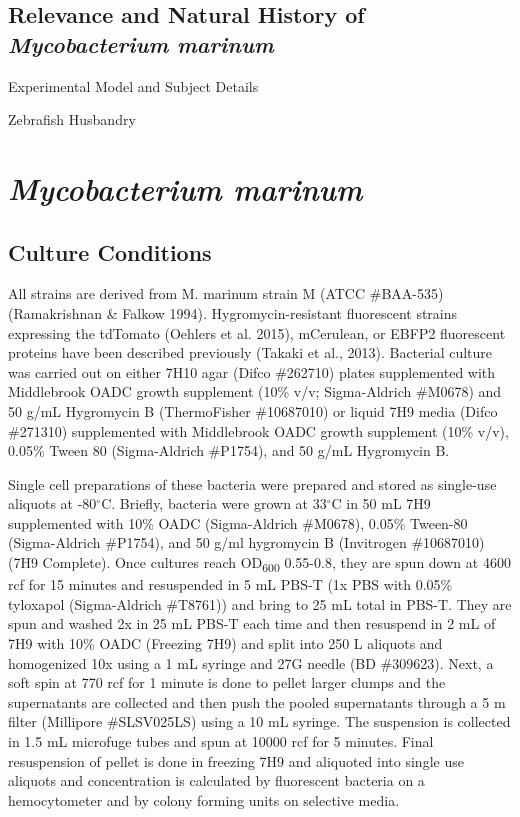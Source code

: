 \subsection{Relevance and Natural History of \textit{Mycobacterium marinum}}




Experimental Model and Subject Details

Zebrafish Husbandry



\section{\textit{Mycobacterium marinum}}

\subsection{Culture Conditions}

All strains are derived from M. marinum strain M (ATCC \#BAA-535) (Ramakrishnan \& Falkow 1994). Hygromycin-resistant fluorescent strains expressing the tdTomato (Oehlers et al. 2015), mCerulean, or EBFP2 fluorescent proteins have been described previously (Takaki et al., 2013). Bacterial culture was carried out on either 7H10 agar (Difco \#262710) plates supplemented with Middlebrook OADC growth supplement (10\% v/v; Sigma-Aldrich \#M0678) and 50 \textmu g/mL Hygromycin B (ThermoFisher \#10687010) or liquid 7H9 media (Difco \#271310) supplemented with Middlebrook OADC growth supplement (10\% v/v), 0.05\% Tween 80 (Sigma-Aldrich \#P1754), and 50 \textmu g/mL Hygromycin B. 

Single cell preparations of these bacteria were prepared and stored as single-use aliquots at -80$^{\circ}$C. Briefly, bacteria were grown at 33$^{\circ}$C in 50 mL 7H9 supplemented with 10\% OADC (Sigma-Aldrich \#M0678), 0.05\% Tween-80 (Sigma-Aldrich \#P1754), and 50 \textmu g/ml hygromycin B (Invitrogen \#10687010) (7H9 Complete). Once cultures reach OD\textsubscript{600} 0.55-0.8, they are spun down at 4600 rcf for 15 minutes and resuspended in 5 mL PBS-T (1x PBS with 0.05\% tyloxapol (Sigma-Aldrich \#T8761)) and bring to 25 mL total in PBS-T. They are spun and washed 2x in 25 mL PBS-T each time and then resuspend in 2 mL of 7H9 with 10\% OADC (Freezing 7H9) and split into 250 \textmu L aliquots and homogenized 10x using a 1 mL syringe and 27G needle (BD \#309623). Next, a soft spin at 770 rcf for 1 minute is done to pellet larger clumps and the supernatants are collected and then push the pooled supernatants through a 5 \textmu m filter (Millipore \#SLSV025LS) using a 10 mL syringe. The suspension is collected in 1.5 mL microfuge tubes and spun at 10000 rcf for 5 minutes. Final resuspension of pellet is done in freezing 7H9 and aliquoted into single use aliquots and concentration is calculated by fluorescent bacteria on a hemocytometer and by colony forming units on selective media.

